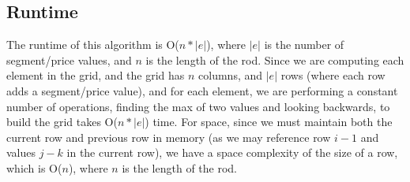 \documentclass[titlepage]{article}
\numberwithin{equation}{subsection}
\begin{document}
\subsection{Runtime}
The runtime of this algorithm is O($n*|e|$), where $|e|$ is the number of segment/price values, and $n$ is the length of the rod. Since we
are computing each element in the grid, and the grid has $n$ columns, and $|e|$ rows (where each row adds a segment/price value), and for each
element, we are performing a constant number of operations, finding the max of two values and looking backwards, to build the grid takes O($n*|e|$)
time. For space, since we must maintain both the current row and previous row in memory (as we may reference row $i-1$ and values $j-k$ in the
current row), we have a space complexity of the size of a row, which is O($n$), where $n$ is the length of the rod.
\end{document}
